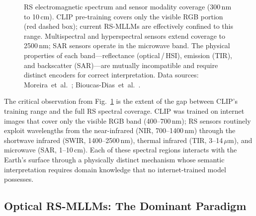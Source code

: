 \begin{figure}[h]
\caption{RS electromagnetic spectrum and sensor modality coverage (300\,nm to 10\,cm).
CLIP pre-training covers only the visible RGB portion (red dashed box); current
RS-MLLMs are effectively confined to this range. Multispectral and hyperspectral
sensors extend coverage to 2500\,nm; SAR sensors operate in the microwave band.
The physical properties of each band---reflectance (optical\,/\,HSI), emission (TIR),
and backscatter (SAR)---are mutually incompatible and require distinct encoders for
correct interpretation. Data sources: Moreira~et~al.~\cite{moreira2013tutorial};
Bioucas-Dias~et~al.~\cite{bioucas2013hyperspectral}.}\label{fig:ems}
\end{figure}

The critical observation from Fig.~\ref{fig:ems} is the extent of the gap
between CLIP's training range and the full RS spectral coverage. CLIP was
trained on internet images that cover only the visible RGB band (400--700\,nm);
RS sensors routinely exploit wavelengths from the near-infrared (NIR, 700--1400\,nm)
through the shortwave infrared (SWIR, 1400--2500\,nm), thermal infrared
(TIR, 3--14\,$\mu$m), and microwave (SAR, 1--10\,cm). Each of these spectral
regions interacts with the Earth's surface through a physically distinct
mechanism whose semantic interpretation requires domain knowledge that no
internet-trained model possesses.

\subsection{Optical RS-MLLMs: The Dominant Paradigm}\label{sec5:optical}

